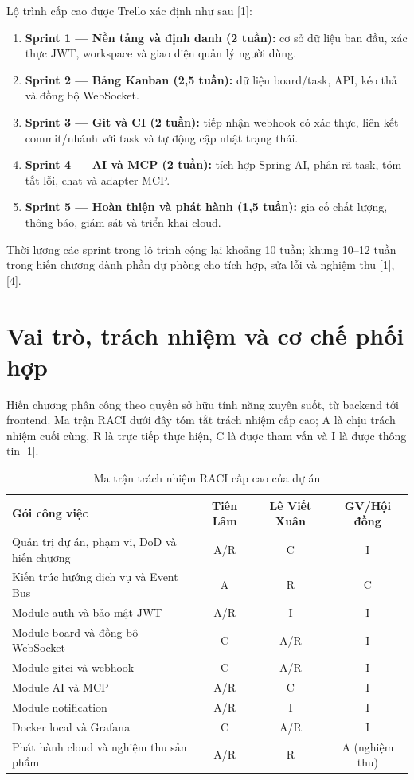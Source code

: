 \documentclass[12pt,a4paper]{report}
\begin{document}
Lộ trình cấp cao được Trello xác định như sau [1]:
\begin{enumerate}
    \item \textbf{Sprint 1 — Nền tảng và định danh (2 tuần):} cơ sở dữ liệu ban đầu, xác thực JWT, workspace và giao diện quản lý người dùng.
    \item \textbf{Sprint 2 — Bảng Kanban (2,5 tuần):} dữ liệu board/task, API, kéo thả và đồng bộ WebSocket.
    \item \textbf{Sprint 3 — Git và CI (2 tuần):} tiếp nhận webhook có xác thực, liên kết commit/nhánh với task và tự động cập nhật trạng thái.
    \item \textbf{Sprint 4 — AI và MCP (2 tuần):} tích hợp Spring AI, phân rã task, tóm tắt lỗi, chat và adapter MCP.
    \item \textbf{Sprint 5 — Hoàn thiện và phát hành (1,5 tuần):} gia cố chất lượng, thông báo, giám sát và triển khai cloud.
\end{enumerate}
Thời lượng các sprint trong lộ trình cộng lại khoảng 10 tuần; khung 10–12 tuần trong hiến chương dành phần dự phòng cho tích hợp, sửa lỗi và nghiệm thu [1], [4].

\section{Vai trò, trách nhiệm và cơ chế phối hợp}
Hiến chương phân công theo quyền sở hữu tính năng xuyên suốt, từ backend tới frontend. Ma trận RACI dưới đây tóm tắt trách nhiệm cấp cao; A là chịu trách nhiệm cuối cùng, R là trực tiếp thực hiện, C là được tham vấn và I là được thông tin [1].

\begin{table}[H]
\centering
\caption{Ma trận trách nhiệm RACI cấp cao của dự án}
\begin{tabularx}{\textwidth}{|X|c|c|c|}
\hline
\textbf{Gói công việc} & \textbf{Tiên Lâm} & \textbf{Lê Viết Xuân} & \textbf{GV/Hội đồng} \\
\hline
Quản trị dự án, phạm vi, DoD và hiến chương & A/R & C & I \\
Kiến trúc hướng dịch vụ và Event Bus & A & R & C \\
Module auth và bảo mật JWT & A/R & I & I \\
Module board và đồng bộ WebSocket & C & A/R & I \\
Module gitci và webhook & C & A/R & I \\
Module AI và MCP & A/R & C & I \\
Module notification & A/R & I & I \\
Docker local và Grafana & C & A/R & I \\
Phát hành cloud và nghiệm thu sản phẩm & A/R & R & A (nghiệm thu) \\
\hline
\end{tabularx}
\end{table}
\end{document}
